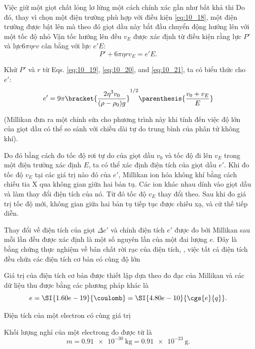 Việc giữ một giọt chất lỏng lơ lửng một cách chính xác gần như bất khả thi
Do đó, thay vì chọn một điện trường phù hợp với điều kiện \eqref{eq:10_18}, một điện trường được bật lên mà theo đó giọt dầu này bắt đầu chuyển động hướng lên với một tốc độ nhỏ
Vận tốc hướng lên đều $v_E$ được xác định từ điều kiện rằng lực $P'$ và lực$6\pi\eta rv$ cân bằng với lực $e'E$:
\begin{equation}\label{eq:10_21}
    P' + 6\pi\eta rv_E = e'E.
\end{equation}

Khử $P'$ và $r$ từ Eqs. \eqref{eq:10_19}, \eqref{eq:10_20}, and \eqref{eq:10_21}, ta có biểu thức cho $e'$:
\begin{equation}\label{eq:10_22}
    e' = 9\pi \bracket{ \frac{2\eta^3 v_0}{(\rho-\rho_0)g} }^{1/2} \parenthesis{ \frac{v_0+v_E}{E} }
\end{equation}

\noindent
(Millikan đưa ra một chỉnh sửa cho phương trình này khi tính đến việc độ lớn của giọt dầu có thể so sánh với chiều dài tự do trung bình của phân tử không khí).

Do đó bằng cách đo tốc độ rơi tự do của giọt dầu $v_0$ và tốc độ đi lên $v_E$ trong một điện trường xác định $E$, ta có thể xác định điện tích của giọt dầu $e'$.
Khi đo tốc độ $v_E$ tại các giá trị nào đó của $e'$, Millikan ion hóa không khí bằng cách chiếu tia X qua không gian giữa hai bản tụ.
Các ion khác nhau dính vào giọt dầu và làm thay đổi điện tích của nó.
Từ đó tốc độ $v_E$ thay đổi theo.
Sau khi đo giá trị tốc độ mới, không gian giữa hai bản tụ tiếp tục được chiếu xạ, và cứ thế tiếp diễn.

Thay đổi về điện tích của giọt $\Delta{e'}$ và chính điện tích $e'$ được đo bởi Millikan sau mỗi lần đều được xác định là một số nguyên lần của một đai lượng $e$.
Đây là bằng chứng thực nghiệm về bản chất rời rạc của điện tích, \ie, việc tất cả điện tích đều chứa các điện tích cơ bản có cùng độ lớn

Giá trị của điện tích cơ bản được thiết lập dựa theo đo đạc của Millikan và các dữ liệu thu được bằng các phương pháp khác là
\begin{equation}\label{eq:10_23}
    e = \SI{1.60e-19}{\coulomb} = \SI{4.80e-10} {\cgs{e}{q}}.
\end{equation}

\noindent
Điện tích của một electron có cùng giá trị

Khối lượng nghỉ của một electrong đo được từ  là
\begin{equation}\label{eq:10_24}
    m = \SI{0.91e-30}{\kilo\gram} = \SI{0.91e-23} {\gram}.
\end{equation}

